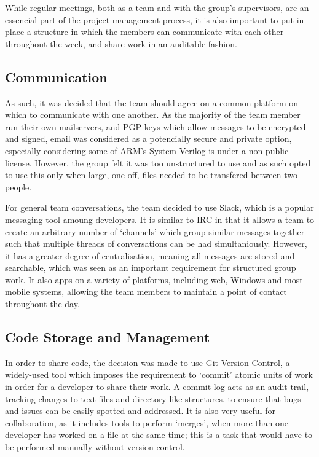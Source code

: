 
While regular meetings, both as a team and with the group's supervisors, are an essencial part of the project management process, it is also important to put in place a structure in which the members can communicate with each other throughout the week, and share work in an auditable fashion.

\subsection{Communication}
As such, it was decided that the team should agree on a common platform on which to communicate with one another. As the majority of the team member run their own mailservers, and PGP keys which allow messages to be encrypted and signed, email was considered as a potencially secure and private option, especially considering some of ARM's System Verilog is under a non-public license. However, the group felt it was too unstructured to use and as such opted to use this only when large, one-off, files needed to be transfered between two people.

For general team conversations, the team decided to use Slack, which is a popular messaging tool amoung developers. It is similar to IRC in that it allows a team to create an arbitrary number of `channels' which group similar messages together such that multiple threads of conversations can be had simultaniously. However, it has a greater degree of centralisation, meaning all messages are stored and searchable, which was seen as an important requirement for structured group work. It also apps on a variety of platforms, including web, Windows and most mobile systems, allowing the team members to maintain a point of contact throughout the day.

\subsection{Code Storage and Management}
In order to share code, the decision was made to use Git Version Control, a widely-used tool which imposes the requirement to `commit' atomic units of work in order for a developer to share their work. A commit log acts as an audit trail, tracking changes to text files and directory-like structures, to ensure that bugs and issues can be easily spotted and addressed. It is also very useful for collaboration, as it includes tools to perform `merges', when more than one developer has worked on a file at the same time; this is a task that would have to be performed manually without version control.

